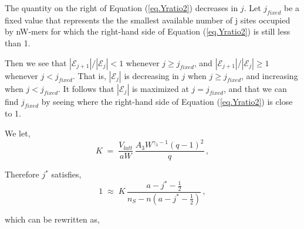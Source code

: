 \documentclass[journal=mamobx,manuscript=article]{achemso}
\begin{document}
The quantity on the right of Equation (\ref{eq.Yratio2}) decreases in $j$.  
Let $j_{fixed}$ be a fixed value that represents the the smallest available number of j sites occupied by nW-mers for which the right-hand side of Equation (\ref{eq.Yratio2}) is still less than 1.

Then we see that $|\mathcal{E}_{j+1}|/|\mathcal{E}_j|<1$ whenever $j\geq j_{fixed}$, and 
$|\mathcal{E}_{j+1}|/|\mathcal{E}_j|\geq 1$ whenever $j< j_{fixed}$.
That is, $|\mathcal{E}_j|$ is decreasing in $j$ when $j\geq j_{fixed}$, and 
increasing when $j< j_{fixed}$.
It follows that $|\mathcal{E}_j|$ is maximized at $j=j_{fixed}$, and that we can find $j_{fixed}$ by seeing 
where the right-hand side of Equation (\ref{eq.Yratio2}) is close to 1.   

\noindent We let, 
\begin{equation}
    \label{}
K \;=\;   \frac{ V_{latt} }{aW}\, \frac{   A_3W^{\gamma_3-1}(q-1)^2}{q} \,,
\end{equation}


\noindent Therefore $j^*$ satisfies,
\begin{equation}
    \label{}
    1  \;\approx \; 
     K  \,
          \frac{a-j^*-\frac{1}{2}}{n_S-n(a-j^*-\frac{1}{2})}    \,,  
\end{equation}

\noindent which can be rewritten as, 

\end{document}
